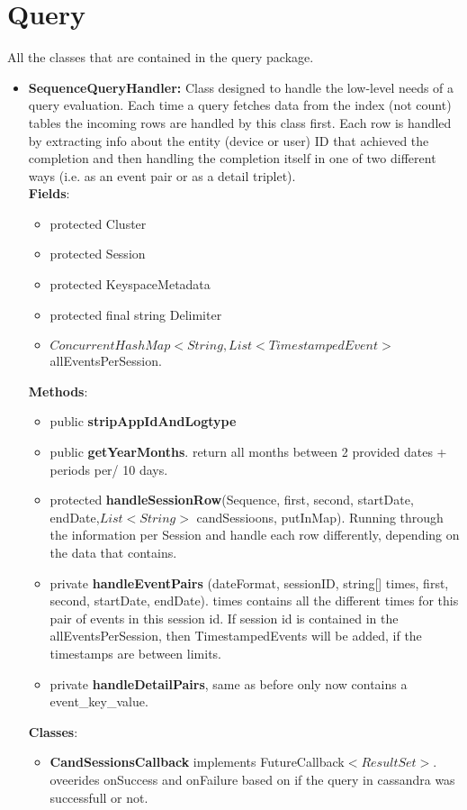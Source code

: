 \documentclass{article}
\begin{document}
\section{Query}
All the classes that are contained in the query package.
\begin{itemize}
	\item\textbf{SequenceQueryHandler: }Class designed to handle the low-level needs of a query evaluation. Each time a query fetches data from the index (not count) tables the incoming rows are handled by this class first.
	Each row is handled by extracting info about the entity (device or user) ID that achieved the completion and then handling the completion itself in one of two different ways (i.e. as an event pair or as a detail triplet).\\
	\textbf{Fields}:\begin{itemize}
		\item protected Cluster
		\item protected Session
		\item protected KeyspaceMetadata
		\item protected final string Delimiter
		\item $ConcurrentHashMap < String, List<TimestampedEvent> $ allEventsPerSession.
	\end{itemize}
	\textbf{Methods}: \begin{itemize}
		\item public  \textbf{stripAppIdAndLogtype}
		\item public \textbf{getYearMonths}. return all months between 2 provided dates + periods per/ 10 days.
		\item protected \textbf{handleSessionRow}(Sequence, first, second, startDate, endDate,$List<String>$ candSessioons, putInMap). Running through the information per Session and handle each row differently, depending on the data that contains.
		\item private \textbf{handleEventPairs} (dateFormat, sessionID, string[] times, first, second, startDate, endDate). times contains all the different times for this pair of events in this session id. If session id is contained in the allEventsPerSession, then TimestampedEvents will be added, if the timestamps are between limits.
		\item private \textbf{handleDetailPairs}, same as before only now contains a event\_key\_value.
	\end{itemize}
	\textbf{Classes}:\begin{itemize}
		\item \textbf{CandSessionsCallback} implements FutureCallback$<ResultSet>$. oveerides onSuccess and onFailure based on if the query in cassandra was successfull or not.
	\end{itemize}


\end{itemize}
\end{document}
